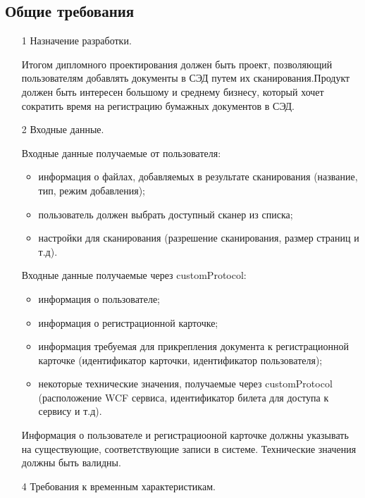 \subsection{Общие требования}


\begin{itemize}
  \item[1] Назначение разработки.

  \hspace*{2.5em}Итогом дипломного проектирования должен быть проект, позволяющий пользователям добавлять документы в СЭД путем их сканирования.Продукт должен быть интересен большому и среднему бизнесу, который хочет сократить время на регистрацию бумажных документов в СЭД.

  \item[2] Входные данные.

	\hspace*{2.5em}Входные данные получаемые от пользователя:
  \begin{itemize}
  	\item информация о файлах, добавляемых в результате сканирования (название, тип, режим добавления);
  	\item пользователь должен выбрать доступный сканер из списка;
  	\item настройки для сканирования (разрешение сканирования, размер страниц и т.д).
  \end{itemize}

  \hspace*{2.5em}Входные данные получаемые через customProtocol:
  \begin{itemize}
  	\item информация о пользователе; 
  	\item информация о регистрационной карточке;
   	\item информация требуемая для прикрепления документа к регистрационной карточке (идентификатор карточки, идентификатор пользователя);
  	\item некоторые технические значения, получаемые через customProtocol (расположение WCF сервиса, идентификатор билета для доступа к сервису и т.д).
  \end{itemize}

  \hspace*{2.5em}Информация о пользователе и регистрациооной карточке должны указывать на существующие, соответствующие записи в системе. Технические значения должны быть валидны.
 
  \item[4] Требования к временным характеристикам.


\end{itemize}
